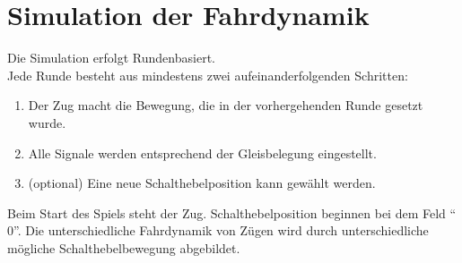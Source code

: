 \documentclass[
    nexus,      %
    10pt,        %
    oneside,
    draft=true,
    green,
]{tubsbook} %
\begin{document}
\chapter{Simulation der Fahrdynamik}
  \noindent Die Simulation erfolgt Rundenbasiert.\\ Jede Runde besteht aus mindestens zwei aufeinanderfolgenden Schritten:
  \begin{enumerate}
    \item Der Zug macht die Bewegung, die in der vorhergehenden Runde gesetzt wurde.
    \item Alle Signale werden entsprechend der Gleisbelegung eingestellt.
    \item (optional) Eine neue Schalthebelposition kann gewählt werden.
  \end{enumerate}
   Beim Start des Spiels steht der Zug. Schalthebelposition beginnen bei dem Feld ``$0$''.
   Die unterschiedliche Fahrdynamik von Zügen wird durch unterschiedliche mögliche Schalthebelbewegung abgebildet.

\newpage
\end{document}
